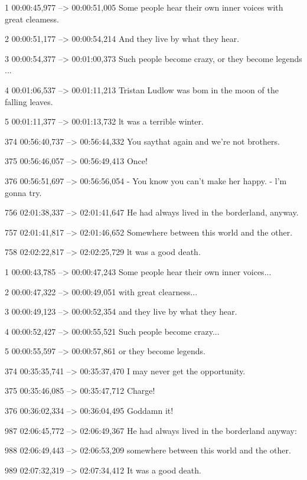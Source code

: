 \begin{subexam}
1
00:00:45,977 --> 00:00:51,005
Some people hear their own
inner voices with great cleamess.

2
00:00:51,177 --> 00:00:54,214
And they live by what they hear.

3
00:00:54,377 --> 00:01:00,373
Such people become crazy,
or they become legends ...

4
00:01:06,537 --> 00:01:11,213
Tristan Ludlow was bom
in the moon of the falling leaves.

5
00:01:11,377 --> 00:01:13,732
lt was a terrible winter.

374
00:56:40,737 --> 00:56:44,332
You saythat again
and we're not brothers.

375
00:56:46,057 --> 00:56:49,413
Once!

376
00:56:51,697 --> 00:56:56,054
- You know you can't make her happy.
- l'm gonna try.

756
02:01:38,337 --> 02:01:41,647
He had always lived
in the borderland, anyway.

757
02:01:41,817 --> 02:01:46,652
Somewhere between this world
and the other.

758
02:02:22,817 --> 02:02:25,729
lt was a good death.
\end{subexam}
\hspace{0.5cm}
\begin{subexam}
1
00:00:43,785 --> 00:00:47,243
Some people hear their own
inner voices...

2
00:00:47,322 --> 00:00:49,051
with great clearness...

3
00:00:49,123 --> 00:00:52,354
and they live
by what they hear.

4
00:00:52,427 --> 00:00:55,521
Such people become crazy...

5
00:00:55,597 --> 00:00:57,861
or they become legends.

374
00:35:35,741 --> 00:35:37,470
I may never get the opportunity.

375
00:35:46,085 --> 00:35:47,712
Charge!

376
00:36:02,334 --> 00:36:04,495
Goddamn it!

987
02:06:45,772 --> 02:06:49,367
He had always lived
in the borderland anyway:

988
02:06:49,443 --> 02:06:53,209
somewhere between this world
and the other.

989
02:07:32,319 --> 02:07:34,412
It was a good death.
\end{subexam}

